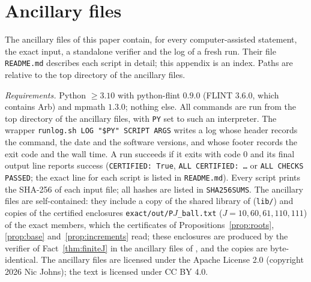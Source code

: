\section{Ancillary files}\label{app:anc}

The ancillary files of this paper contain, for every computer-assisted statement, the exact input, a standalone verifier
and the log of a fresh run. Their file \nolinkurl{README.md} describes each script in detail; this appendix is an index.
Paths are relative to the top directory of the ancillary files.

\emph{Requirements.} Python $\ge3.10$ with python-flint $0.9.0$ (FLINT $3.6.0$, which contains Arb) and mpmath $1.3.0$;
nothing else. All commands are run from the top directory of the ancillary files, with \texttt{PY} set to such an
interpreter. The wrapper \texttt{runlog.sh LOG "\$PY" SCRIPT ARGS} writes a log whose header records the command, the date
and the software versions, and whose footer records the exit code and the wall time. A run succeeds if it exits with
code $0$ and its final output line reports success (\texttt{CERTIFIED: True}, \texttt{ALL CERTIFIED: \dots} or
\texttt{ALL CHECKS PASSED}; the exact line for each script is listed in \nolinkurl{README.md}). Every script prints the
SHA-256 of each input file; all hashes are listed in \texttt{SHA256SUMS}. The ancillary files are self-contained: they
include a copy of the shared library of \cite{PaperI} (\nolinkurl{lib/}) and copies of the certified enclosures
\nolinkurl{exact/out/P}$J$\nolinkurl{_ball.txt} ($J=10,60,61,110,111$) of the exact members, which the certificates of
Propositions~\ref{prop:roots}, \ref{prop:base} and~\ref{prop:increments} read; these enclosures are produced by the verifier of
Fact~\ref{thm:finiteJ} in the ancillary files of \cite{PaperI}, and the copies are byte-identical. The ancillary files are licensed under the Apache License 2.0 (copyright 2026 Nic Johns); the text is licensed under
CC BY 4.0.

